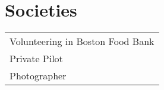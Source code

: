 \documentclass[letterpaper]{lyu-resume} %
\begin{document}
\begin{minipage}[t]{0.66\textwidth}
\sectionspace %





\section{Societies} 

\begin{tabular}{l}

\textbullet{} Volunteering in Boston Food Bank\\
\textbullet{} Private Pilot\\
\textbullet{} Photographer\\
\end{tabular}

\sectionspace %


\end{minipage} %








\end{document}
